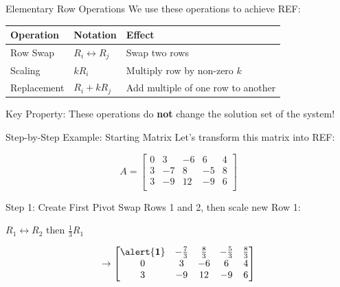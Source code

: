 \documentclass[aspectratio=169,xcolor=dvipsnames,svgnames,x11names,fleqn]{beamer}
\begin{document}
\begin{frame}{Elementary Row Operations}
\centering
We use these operations to achieve REF:

\vspace{5mm}
\begin{tabular}{lll}
\toprule
\textbf{Operation} & \textbf{Notation} & \textbf{Effect} \\
\midrule
Row Swap & $R_i \leftrightarrow R_j$ & Swap two rows \\
Scaling & $kR_i$ & Multiply row by non-zero $k$ \\
Replacement & $R_i + kR_j$ & Add multiple of one row to another \\
\bottomrule
\end{tabular}

\vspace{8mm}
\alert{Key Property:} These operations do \textbf{not} change the solution set of the system!
\end{frame}

\begin{frame}{Step-by-Step Example: Starting Matrix}
\centering
Let's transform this matrix into REF:

$$
A = \begin{bmatrix}
0 & 3 & -6 & 6 & 4 \\
3 & -7 & 8 & -5 & 8 \\
3 & -9 & 12 & -9 & 6 \\
\end{bmatrix}
$$

\vspace{5mm}
\end{frame}

\begin{frame}{Step 1: Create First Pivot}
\centering
Swap Rows 1 and 2, then scale new Row 1:

\vspace{3mm}
$R_1 \leftrightarrow R_2$ then $\frac{1}{3}R_1$


\vspace{3mm}
$$
\rightarrow \begin{bmatrix}
\alert{\mathbf{1}} & -\frac{7}{3} & \frac{8}{3} & -\frac{5}{3} & \frac{8}{3} \\
0 & 3 & -6 & 6 & 4 \\
3 & -9 & 12 & -9 & 6 \\
\end{bmatrix}
$$
\end{frame}
\end{document}
